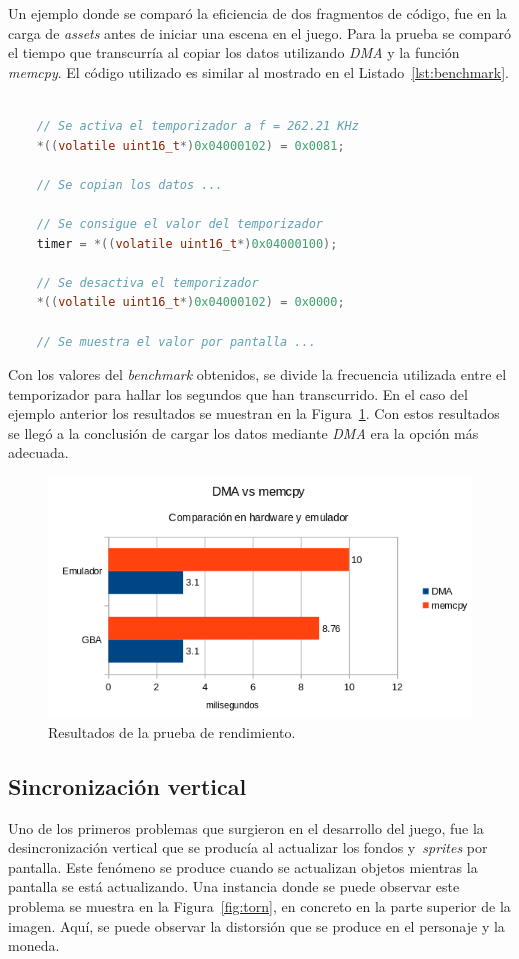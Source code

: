 \begin{itemize}
		Un ejemplo donde se comparó la eficiencia de dos fragmentos de código, fue en la carga de \textit{assets} antes de iniciar una escena en el juego. Para la prueba se comparó el tiempo que transcurría al copiar los datos utilizando \textit{DMA} y la función \textit{memcpy}. El código utilizado es similar al mostrado en el Listado~\ref{lst:benchmark}.

		\vspace{1cm}

	\begin{lstlisting}[language=c,caption={Tomando medidas mediante temporizadores.},label={lst:benchmark}]

	// Se activa el temporizador a f = 262.21 KHz
	*((volatile uint16_t*)0x04000102) = 0x0081;

	// Se copian los datos ...

	// Se consigue el valor del temporizador
	timer = *((volatile uint16_t*)0x04000100);

	// Se desactiva el temporizador
	*((volatile uint16_t*)0x04000102) = 0x0000;

	// Se muestra el valor por pantalla ...

	\end{lstlisting}

		Con los valores del \textit{benchmark} obtenidos, se divide la frecuencia utilizada entre el temporizador para hallar los segundos que han transcurrido. En el caso del ejemplo anterior los resultados se muestran en la Figura~\ref{fig:plot_bench}. Con estos resultados se llegó a la conclusión de cargar los datos mediante \textit{DMA} era la opción más adecuada. 

		\begin{figure}[h]
			\centering
			\includegraphics[width=.55\textwidth]{capitulos/capitulo5/graph_bench.png}
			\caption{Resultados de la prueba de rendimiento.}\label{fig:plot_bench}
		\end{figure}
\end{itemize}
\FloatBarrier{}

\subsection{Sincronización vertical}
Uno de los primeros problemas que surgieron en el desarrollo del juego, fue la desincronización vertical que se producía al actualizar los fondos y~\textit{sprites} por pantalla. Este fenómeno se produce cuando se actualizan objetos mientras la pantalla se está actualizando. Una instancia donde se puede observar este problema se muestra en la Figura~\ref{fig:torn}, en concreto en la parte superior de la imagen. Aquí, se puede observar la distorsión que se produce en el personaje y la moneda. 


